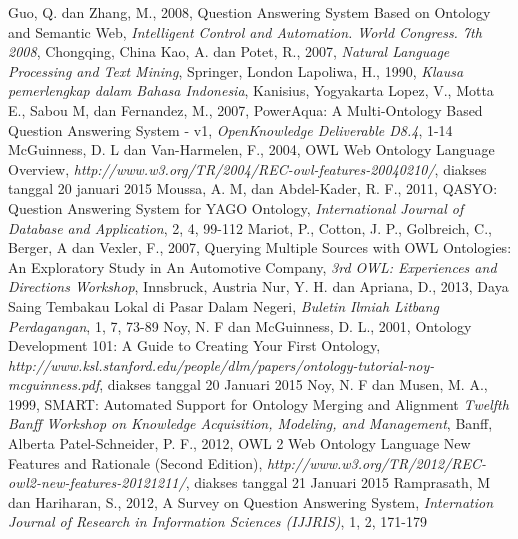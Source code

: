 \begin{thebibliography}{99}
		Guo, Q. dan Zhang, M., 2008, Question Answering System Based on Ontology and Semantic Web, \emph{Intelligent Control and Automation. World Congress. 7th 2008}, Chongqing, China
		Kao, A. dan Potet, R., 2007, \emph{Natural Language Processing and Text Mining}, Springer, London
		Lapoliwa, H., 1990, \emph{Klausa pemerlengkap dalam Bahasa Indonesia}, Kanisius, Yogyakarta
		Lopez, V., Motta E., Sabou M, dan Fernandez, M., 2007, PowerAqua: A Multi-Ontology Based Question Answering System - v1, \emph{OpenKnowledge Deliverable D8.4}, 1-14
		McGuinness, D. L dan Van-Harmelen, F., 2004, OWL Web Ontology Language Overview, \emph{http://www.w3.org/TR/2004/REC-owl-features-20040210/}, diakses tanggal 20 januari 2015
		Moussa, A. M, dan Abdel-Kader, R. F., 2011, QASYO: Question Answering System for YAGO Ontology, \emph{International Journal of Database and Application}, 2, 4, 99-112
		Mariot, P., Cotton, J. P., Golbreich, C., Berger, A dan Vexler, F., 2007, Querying Multiple Sources with OWL Ontologies: An Exploratory Study in An Automotive Company, \emph{3rd OWL: Experiences and Directions Workshop}, Innsbruck, Austria
		Nur, Y. H. dan Apriana, D., 2013, Daya Saing Tembakau Lokal di Pasar Dalam Negeri, \emph{Buletin Ilmiah Litbang Perdagangan}, 1, 7, 73-89
		Noy, N. F dan McGuinness, D. L., 2001, Ontology Development 101: A Guide to Creating Your First Ontology, \emph{http://www.ksl.stanford.edu/people/dlm/papers/ontology-tutorial-noy-mcguinness.pdf}, diakses tanggal 20 Januari 2015
		Noy, N. F dan Musen, M. A., 1999, SMART: Automated Support for Ontology Merging and Alignment \emph{Twelfth Banff Workshop on Knowledge Acquisition, Modeling, and Management}, Banff, Alberta
		Patel-Schneider, P. F., 2012, OWL 2 Web Ontology Language New Features and Rationale (Second Edition), \emph{http://www.w3.org/TR/2012/REC-owl2-new-features-20121211/}, diakses tanggal 21 Januari 2015
		Ramprasath, M dan Hariharan, S., 2012, A Survey on Question Answering System, \emph{Internation Journal of Research in Information Sciences (IJJRIS)}, 1, 2, 171-179

\end{thebibliography}
